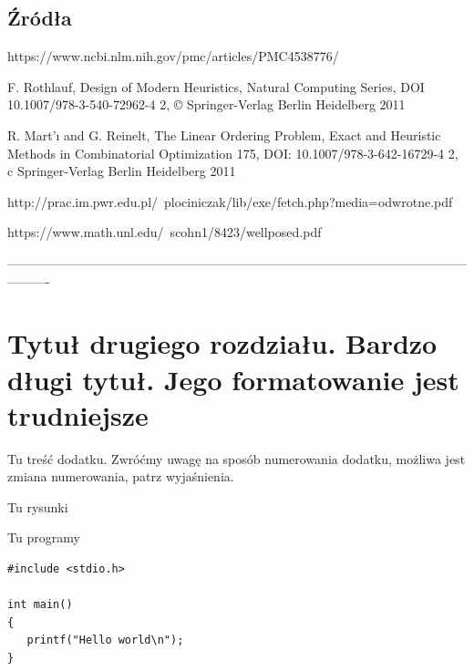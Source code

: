 \documentclass[twoside]{projektInzynierskiMS1}
\begin{document}
	\subsection{Źródła}
https://www.ncbi.nlm.nih.gov/pmc/articles/PMC4538776/

F. Rothlauf, Design of Modern Heuristics, Natural Computing Series,
DOI 10.1007/978-3-540-72962-4 2, © Springer-Verlag Berlin Heidelberg 2011

R. Mart'ı and G. Reinelt, The Linear Ordering Problem, Exact and Heuristic Methods
in Combinatorial Optimization 175, DOI: 10.1007/978-3-642-16729-4 2,
c Springer-Verlag Berlin Heidelberg 2011

http://prac.im.pwr.edu.pl/~plociniczak/lib/exe/fetch.php?media=odwrotne.pdf

https://www.math.unl.edu/~scohn1/8423/wellposed.pdf

%


----------------------------------------------------------------------------------------------------------------------
\section[Tytuł drugiego rozdziału. Bardzo długi \ldots]
        {Tytuł drugiego rozdziału. \newlineTekst Bardzo długi tytuł. \newlineTekst
          Jego \newlineSpis formatowanie jest trudniejsze}




Tu treść dodatku. Zwróćmy uwagę na sposób numerowania dodatku, 
możliwa jest zmiana numerowania, patrz wyjaśnienia.
          

Tu rysunki


Tu programy

\begin{verbatim}
#include <stdio.h>

int main()
{
   printf("Hello world\n");
}
\end{verbatim}
\end{document}
